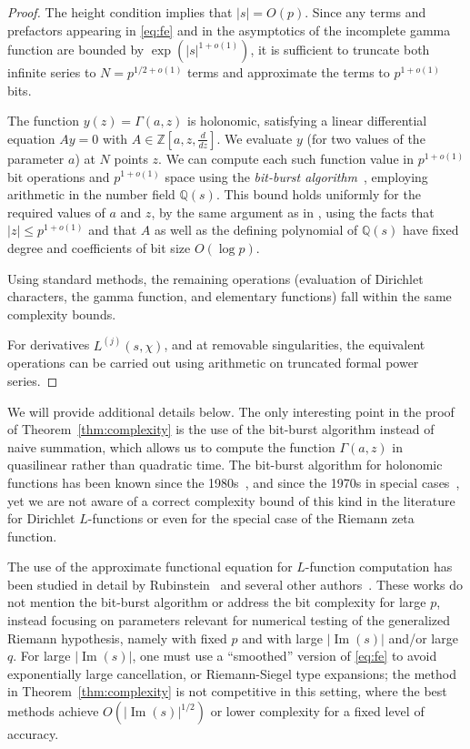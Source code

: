\documentclass[reqno]{amsart}
\newcommand{\Imag}{\operatorname{Im}}
\newcommand{\QQ}{\mathbb{Q}}
\theoremstyle{definition}
\begin{document}
\begin{proof}
The height condition implies that $|s| = O(p)$.
Since any terms and prefactors appearing in \eqref{eq:fe}
and in the asymptotics of the incomplete gamma function are
bounded by $\exp(|s|^{1+o(1)})$,
it is sufficient to truncate both infinite series to $N = p^{1/2+o(1)}$
terms and approximate the terms to $p^{1+o(1)}$ bits.

The function $y(z) = \Gamma(a, z)$ is holonomic,
satisfying a linear differential equation
$A y = 0$ with $A \in \mathbb{Z}[a,z,\tfrac{d}{dz}]$.
We evaluate $y$ (for two values of the
parameter $a$) at $N$ points $z$.
We can compute each such function value
in $p^{1+o(1)}$ bit operations and $p^{1+o(1)}$ space
using the \emph{bit-burst algorithm}~\cite{david1990computer},
employing arithmetic in the number field $\QQ(s)$.
This bound holds uniformly for the required values of $a$ and $z$,
by the same argument as in \cite[Corollary 1]{mezzarobba2012note},
using the facts that $|z| \le p^{1+o(1)}$
and that $A$ as well as the defining polynomial of $\mathbb{Q}(s)$
have fixed degree and coefficients of bit size $O(\log p)$.

Using standard methods,
the remaining operations (evaluation of Dirichlet characters,
the gamma function, and elementary functions) fall within the
same complexity bounds.

For derivatives $L^{(j)}(s,\chi)$, and at removable singularities,
the equivalent operations
can be carried out using arithmetic on truncated formal power series.
\end{proof}

We will provide additional details below.
The only interesting point in the proof of Theorem~\ref{thm:complexity}
is the use of the bit-burst algorithm
instead of naive summation, which allows us to compute
the function $\Gamma(a,z)$ in quasilinear rather
than quadratic time.
The bit-burst algorithm for holonomic functions
has been known since the 1980s~\cite{david1990computer,vdH:hol,van2001fast,Mezzarobba2011,mezzarobba2012note},
and since the 1970s in special cases~\cite{brent1976complexity},
yet we are not aware of a correct complexity bound
of this kind in the literature for Dirichlet $L$-functions
or even for the special case of the Riemann zeta function.

The use of the approximate functional equation for $L$-function
computation
has been studied in detail
by Rubinstein~\cite{rubinstein1998evidence}
and several other authors~\cite{dokchitser2004computing,booker2006artin,molin2010integration,belabas2021numerical}.
These works do not mention the bit-burst algorithm or address
the bit complexity for large $p$, instead focusing
on parameters relevant for numerical testing of the generalized Riemann hypothesis,
namely with fixed $p$ and with large $|\Imag(s)|$ and/or large $q$.
For large $|\Imag(s)|$, one must use a ``smoothed'' version of \eqref{eq:fe}
to avoid exponentially large cancellation, or Riemann-Siegel
type expansions; the method in Theorem~\ref{thm:complexity}
is not competitive in this setting, where the best methods
achieve $O(|\Imag(s)|^{1/2})$ or lower complexity for a fixed level of accuracy.
\end{document}
